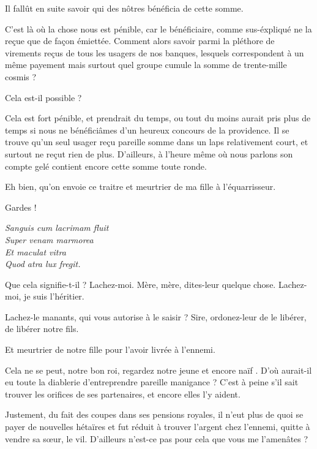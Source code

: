 \begin{drama}
  \roispeaks Il fallût en suite savoir qui des nôtres bénéficia de cette somme.

  \impositeurspeaks C’est là où la chose nous est pénible, car le bénéficiaire, comme sus-éxpliqué ne la reçue que de façon émiettée. Comment alors savoir parmi la pléthore de virements reçus de tous les usagers de nos banques, lesquels correspondent à un même payement mais surtout quel groupe cumule la somme de trente-mille cosmis ?

  \roispeaks Cela est-il possible ?

  \impositeurspeaks Cela est fort pénible, et prendrait du temps, ou tout du moins aurait pris plus de temps si nous ne bénéficiâmes d’un heureux concours de la providence. Il se trouve qu’un seul usager reçu pareille somme dans un laps relativement court, et surtout ne reçut rien de plus. D’ailleurs, à l’heure même où nous parlons son compte gelé contient encore cette somme toute ronde.

  \reinespeaks Eh bien, qu’on envoie ce traitre et meurtrier de ma fille à l’équarrisseur.

  \roispeaks Gardes !


  \choirspeaks
  \begin{minipage}[t]{\linewidth}
    \em
    Sanguis cum lacrimam fluit\endnote{\lacrimamendnote}\\
    Super venam marmorea\\
    Et maculat vitra\\
    Quod atra lux fregit.
  \end{minipage}

  \vladimirspeaks Que cela signifie-t-il ? Lachez-moi.  Mère, mère, dites-leur quelque chose. Lachez-moi, je suis l’héritier.


  \reinespeaks {} Lachez-le manants, qui vous autorise à le saisir ?  Sire, ordonez-leur de le libérer, de libérer notre fils.

  \roispeaks Et meurtrier de notre fille pour l’avoir livrée à l’ennemi.

  \reinespeaks Cela ne se peut, notre bon roi, regardez notre jeune et encore naïf \vladimir{}. D’où aurait-il eu toute la diablerie d’entreprendre pareille manigance ? C’est à peine s’il sait trouver les orifices de ses partenaires, et encore elles l’y aident.

  \roispeaks Justement, du fait des coupes dans ses pensions royales, il n’eut plus de quoi se payer de nouvelles hétaïres et fut réduit à trouver l’argent chez l’ennemi, quitte à vendre sa sœur, le vil. D’ailleurs n’est-ce pas pour cela que vous me l’amenâtes ?


\end{drama}

